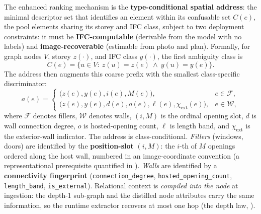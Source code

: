 The enhanced ranking mechanism is the \textbf{type-conditional spatial address}: the minimal
descriptor set that identifies an element within its confusable set $C(e)$, the pool elements
sharing its storey and IFC class, subject to two deployment constraints: it must be
\textbf{IFC-computable} (derivable from the model with no labels) and \textbf{image-recoverable}
(estimable from photo and plan). Formally, for graph nodes $V$, storey $z(\cdot)$, and IFC class
$y(\cdot)$, the first ambiguity class is
\[
C(e)=\{u\in V:\ z(u)=z(e)\ \land\ y(u)=y(e)\}.
\]
The address then augments this coarse prefix with the smallest class-specific discriminator:
\[
a(e)=
\begin{cases}
\bigl(z(e),y(e),i(e),M(e)\bigr), & e\in\mathcal{F},\\
\bigl(z(e),y(e),d(e),o(e),\ell(e),\chi_{\mathrm{ext}}(e)\bigr), & e\in\mathcal{W},
\end{cases}
\]
where $\mathcal{F}$ denotes fillers, $\mathcal{W}$ denotes walls, $(i,M)$ is the ordinal opening
slot, $d$ is wall connection degree, $o$ is hosted-opening count, $\ell$ is length band, and
$\chi_{\mathrm{ext}}$ is the exterior-wall indicator. The address is class-conditional. \emph{Fillers} (windows, doors) are
identified by the \textbf{position-slot} $(i, M)$: the $i$-th of $M$ openings ordered along the host
wall, numbered in an image-coordinate convention (a representational prerequisite quantified in
). \emph{Walls} are identified by a \textbf{connectivity fingerprint}
(\texttt{connection\_degree}, \texttt{hosted\_opening\_count}, \texttt{length\_band},
\texttt{is\_external}). Relational context is \emph{compiled into the node} at ingestion: the
depth-1 sub-graph and the distilled node attributes carry the same information, so the runtime
extractor recovers at most one hop (the depth law, ).

